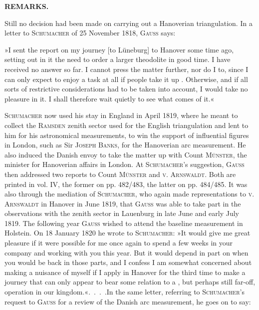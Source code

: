\par\clearpage
\noindent{}\hfill\textbf{REMARKS.}\hfill\null\par\medskip
\par\noindent\hspace*{\parindent}Still no decision had been made on carrying out a Hanoverian triangulation. In a letter to \textsc{Schumacher} of 25 November 1818, \textsc{Gauss} says:

\par\noindent\hspace*{\parindent}»I sent the report on my journey [to Lüneburg] to Hanover some time ago, setting out in it the need to order a larger theodolite in good time. I have received no answer so far. I cannot press the matter further, nor do I  to, since I can only expect to enjoy a task at all if people take it up . Otherwise, and if all sorts of restrictive considerations had to be taken into account, I would take no pleasure in it. I shall therefore wait quietly to see what comes of it.«

\par\noindent\hspace*{\parindent}\textsc{Schumacher} now used his stay in England in April 1819, where he meant to collect the \textsc{Ramsden} zenith sector used for the English triangulation and lent to him for his astronomical measurements, to win the support of influential figures in London, such as Sir \textsc{Joseph Banks}, for the Hanoverian arc measurement. He also induced the Danish envoy to take the matter up with Count \textsc{Münster}, the minister for Hanoverian affairs in London. At \textsc{Schumacher}'s suggestion, \textsc{Gauss} then addressed two reports to Count \textsc{Münster} and \textsc{v. Arnswaldt}. Both are printed in vol. IV, the former on pp. 482/483, the latter on pp. 484/485. It was also through the mediation of \textsc{Schumacher}, who again made representations to \textsc{v. Arnswaldt} in Hanover in June 1819, that \textsc{Gauss} was able to take part in the observations with the zenith sector in Lauenburg in late June and early July 1819. The following year \textsc{Gauss} wished to attend the baseline measurement in Holstein. On 18 January 1820 he wrote to \textsc{Schumacher}: »It would give me great pleasure if it were possible for me once again to spend a few weeks in your company and working with you this year. But it would depend in part on when you would be back in those parts, and I confess I am somewhat concerned about making a nuisance of myself if I apply in Hanover for the third time to make a journey that can only appear to bear some relation to a , but perhaps still far-off, operation in our kingdom.«\enspace .\ .\ .\ .\enspace In the same letter, referring to \textsc{Schumacher}'s request to \textsc{Gauss} for a review of the Danish arc measurement, he goes on to say:

